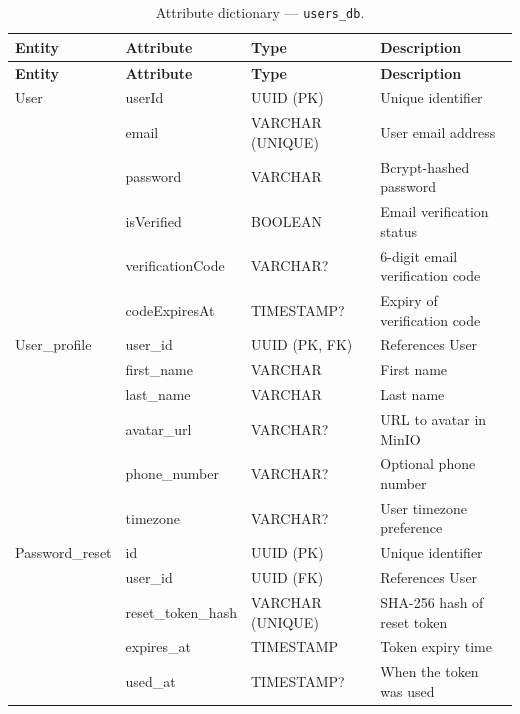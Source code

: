 \begin{longtable}{@{} l l l p{5.5cm} @{}}
  \caption{Attribute dictionary --- \texttt{users\_db}.} \label{tab:dict-users} \\
  \toprule
  \textbf{Entity} & \textbf{Attribute} & \textbf{Type} & \textbf{Description} \\
  \midrule
  \endfirsthead
  \toprule
  \textbf{Entity} & \textbf{Attribute} & \textbf{Type} & \textbf{Description} \\
  \midrule
  \endhead
  User & userId & UUID (PK) & Unique identifier \\
       & email & VARCHAR (UNIQUE) & User email address \\
       & password & VARCHAR & Bcrypt-hashed password \\
       & isVerified & BOOLEAN & Email verification status \\
       & verificationCode & VARCHAR? & 6-digit email verification code \\
       & codeExpiresAt & TIMESTAMP? & Expiry of verification code \\
  \midrule
  User\_profile & user\_id & UUID (PK, FK) & References User \\
               & first\_name & VARCHAR & First name \\
               & last\_name & VARCHAR & Last name \\
               & avatar\_url & VARCHAR? & URL to avatar in MinIO \\
               & phone\_number & VARCHAR? & Optional phone number \\
               & timezone & VARCHAR? & User timezone preference \\
  \midrule
  Password\_reset & id & UUID (PK) & Unique identifier \\
                 & user\_id & UUID (FK) & References User \\
                 & reset\_token\_hash & VARCHAR (UNIQUE) & SHA-256 hash of reset token \\
                 & expires\_at & TIMESTAMP & Token expiry time \\
                 & used\_at & TIMESTAMP? & When the token was used \\
  \bottomrule
\end{longtable}

